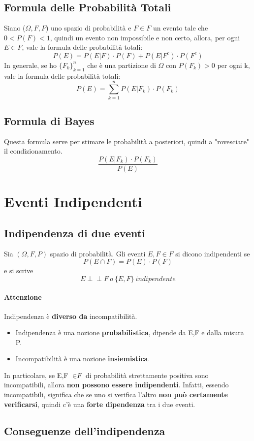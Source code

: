 \documentclass{report}
\newcommand{\indep}{\perp \!\!\! \perp}
\begin{document}
\subsection{Formula delle Probabilità Totali}
Siano (\(\Omega, \textit{F}, P\)) uno spazio di probabilità e \(F \in \textit{F}\) un evento tale che \(0 < P(F) < 1\), quindi un evento non impossibile e non certo, allora, per ogni \(E \in \textit{F}\), vale la formula delle probabilità totali: \[P(E) = P(E|F)\cdot P(F) + P(E|F^c)\cdot P(F^c)\] In generale, se ho \(\{F_k\}^n_{k = 1}\) che è una partizione di \(\Omega\) con \(P(F_k) > 0\) per ogni k, vale la formula delle probabilità totali: \[P(E) = \sum^n_{k=1} P(E|F_k)\cdot P(F_k)\]
\subsection{Formula di Bayes}
Questa formula serve per stimare le probabilità a posteriori, quindi a "rovesciare" il condizionamento. \[\frac{P(E|F_k)\cdot P(F_k)}{P(E)}\]
\section{Eventi Indipendenti}
\subsection{Indipendenza di due eventi}
Sia \((\Omega, \textit{F}, P)\) spazio di probabilità. Gli eventi \(E, F \in \textit{F}\) si dicono indipendenti se \[P(E \cap F) = P(E) \cdot P(F)\] e si scrive \[E \indep F\ o\ \{E, F\}\ indipendente\]
\paragraph{Attenzione} Indipendenza è \textbf{diverso da} incompatibilità. \begin{itemize}
    \item Indipendenza è una nozione \textbf{probabilistica}, dipende da E,F e dalla misura P.
    \item Incompatibilità è una nozione \textbf{insiemistica}.
\end{itemize}
In particolare, se E,F \(\in \textit{F}\) di probabilità strettamente positiva sono incompatibili, allora \textbf{non possono essere indipendenti}. Infatti, essendo incompatibili, significa che se uno si verifica l'altro \textbf{non può certamente verificarsi}, quindi c'è una \textbf{forte dipendenza} tra i due eventi.
\subsection{Conseguenze dell'indipendenza}
\end{document}
